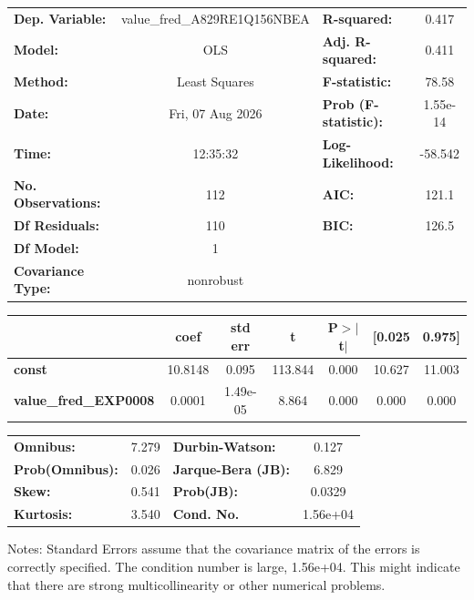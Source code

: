 \begin{center}
\begin{tabular}{lclc}
\toprule
\textbf{Dep. Variable:}       & value\_fred\_A829RE1Q156NBEA & \textbf{  R-squared:         } &     0.417   \\
\textbf{Model:}               &             OLS              & \textbf{  Adj. R-squared:    } &     0.411   \\
\textbf{Method:}              &        Least Squares         & \textbf{  F-statistic:       } &     78.58   \\
\textbf{Date:}                &       Fri, 07 Aug 2026       & \textbf{  Prob (F-statistic):} &  1.55e-14   \\
\textbf{Time:}                &           12:35:32           & \textbf{  Log-Likelihood:    } &   -58.542   \\
\textbf{No. Observations:}    &               112            & \textbf{  AIC:               } &     121.1   \\
\textbf{Df Residuals:}        &               110            & \textbf{  BIC:               } &     126.5   \\
\textbf{Df Model:}            &                 1            & \textbf{                     } &             \\
\textbf{Covariance Type:}     &          nonrobust           & \textbf{                     } &             \\
\bottomrule
\end{tabular}
\begin{tabular}{lcccccc}
                              & \textbf{coef} & \textbf{std err} & \textbf{t} & \textbf{P$> |$t$|$} & \textbf{[0.025} & \textbf{0.975]}  \\
\midrule
\textbf{const}                &      10.8148  &        0.095     &   113.844  &         0.000        &       10.627    &       11.003     \\
\textbf{value\_fred\_EXP0008} &       0.0001  &     1.49e-05     &     8.864  &         0.000        &        0.000    &        0.000     \\
\bottomrule
\end{tabular}
\begin{tabular}{lclc}
\textbf{Omnibus:}       &  7.279 & \textbf{  Durbin-Watson:     } &    0.127  \\
\textbf{Prob(Omnibus):} &  0.026 & \textbf{  Jarque-Bera (JB):  } &    6.829  \\
\textbf{Skew:}          &  0.541 & \textbf{  Prob(JB):          } &   0.0329  \\
\textbf{Kurtosis:}      &  3.540 & \textbf{  Cond. No.          } & 1.56e+04  \\
\bottomrule
\end{tabular}
\end{center}

Notes: \newline
 [1] Standard Errors assume that the covariance matrix of the errors is correctly specified. \newline
 [2] The condition number is large, 1.56e+04. This might indicate that there are \newline
 strong multicollinearity or other numerical problems.